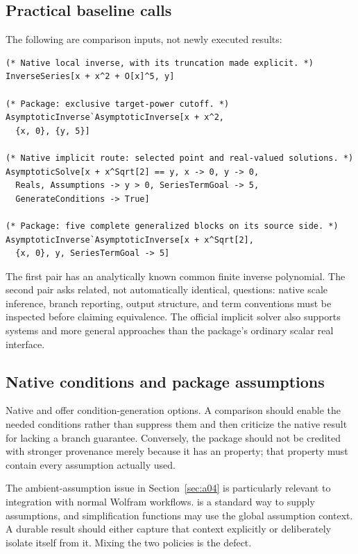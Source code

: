 \subsection{Practical baseline calls}
The following are comparison inputs, not newly executed results:
\begin{lstlisting}
(* Native local inverse, with its truncation made explicit. *)
InverseSeries[x + x^2 + O[x]^5, y]

(* Package: exclusive target-power cutoff. *)
AsymptoticInverse`AsymptoticInverse[x + x^2,
  {x, 0}, {y, 5}]

(* Native implicit route: selected point and real-valued solutions. *)
AsymptoticSolve[x + x^Sqrt[2] == y, x -> 0, y -> 0,
  Reals, Assumptions -> y > 0, SeriesTermGoal -> 5,
  GenerateConditions -> True]

(* Package: five complete generalized blocks on its source side. *)
AsymptoticInverse`AsymptoticInverse[x + x^Sqrt[2],
  {x, 0}, y, SeriesTermGoal -> 5]
\end{lstlisting}
The first pair has an analytically known common finite inverse polynomial. The second pair asks related, not automatically identical, questions: native scale inference, branch reporting, output structure, and term conventions must be inspected before claiming equivalence. The official implicit solver also supports systems and more general approaches than the package's ordinary scalar real interface.\cite{wl-inverse,wl-solve}

\subsection{Native conditions and package assumptions}
Native  and  offer condition-generation options. A comparison should enable the needed conditions rather than suppress them and then criticize the native result for lacking a branch guarantee. Conversely, the package should not be credited with stronger provenance merely because it has an  property; that property must contain every assumption actually used.\cite{wl-asymptotic,wl-solve,guide}

The ambient-assumption issue in Section~\ref{sec:a04} is particularly relevant to integration with normal Wolfram workflows.  is a standard way to supply assumptions, and simplification functions may use the global assumption context. A durable result should either capture that context explicitly or deliberately isolate itself from it. Mixing the two policies is the defect.\cite{wl-assuming,wl-simplify}

